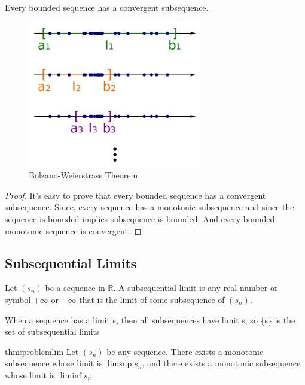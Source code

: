 \documentclass{notes}
\begin{document}
\begin{theorem}{}\cite{wikib}
	Every bounded sequence has a convergent subsequence.
	
	
	
\end{theorem}
\begin{figure}[!h]  %
	\begin{center}
		\includegraphics[width=3in]{resources/bolanzo.png}
		\caption{Bolzano-Weierstrass Theorem}
	\end{center}
\end{figure}
\begin{proof}
	It's easy to prove that every bounded sequence has a convergent subsequence. Since, every sequence has a monotonic subsequence and since  the sequence is bounded implies subsequence is bounded. And every bounded monotonic sequence is convergent.
\end{proof}
\subsection{Subsequential Limits}
\begin{definition}{}
	Let $(s_n)$ be a sequence in $\mathbb{R}$. A subsequential limit is any real number
	or symbol $+\infty$ or $-\infty$ that is the limit of some subsequence of $(s_n)$.
	
	When a sequence has a limit s, then all subsequences have limit
	s, so \{s\} is the set of subsequential limits
\end{definition}


\begin{theorem}{thm:problemlim}
	Let $(s_n)$ be any sequence. There exists a monotonic subsequence
	whose limit is $\limsup s_n$, and there exists a monotonic subsequence
	whose limit is $\liminf s_n$.
\end{theorem}
\end{document}
